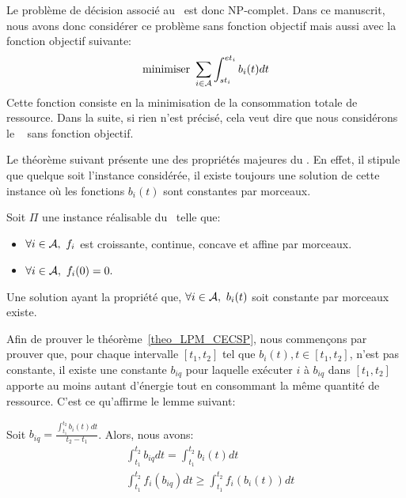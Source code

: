 Le problème de décision associé au \CECSP~est donc NP-complet. Dans ce
manuscrit, nous avons donc considérer ce problème sans fonction
objectif mais aussi avec la fonction objectif suivante: 
\[\text{minimiser } \sum_{i \in {\cal A}} \int_{st_i}^{et_i} b_i(t)dt\]
Cette fonction consiste en la minimisation de la consommation totale
de ressource. Dans la suite, si rien n'est précisé, cela veut dire que
nous considérons le \CECSP~ sans fonction objectif.

Le théorème suivant présente une des propriétés majeures du \CECSP. En
effet, il stipule que quelque soit l'instance considérée, il existe
toujours une solution de cette instance où les fonctions $b_i(t)$ sont
constantes par morceaux. 

\begin{theo}
\label{theo_LPM_CECSP}
Soit $\Pi$ une instance réalisable du \CECSP~telle que:
\begin{itemize}
\item $\forall i \in {\cal A},\ f_i$ est croissante, continue, concave et
  affine par morceaux. 
\item $\forall i \in \A,\ f_i(0)=0.$
\end{itemize}
Une solution ayant la propriété que, $\forall i \in {\cal A},\ b_i(t)$ soit
constante par morceaux existe.
\end{theo}

Afin de prouver le théorème~\ref{theo_LPM_CECSP}, nous commençons par
prouver que, pour chaque intervalle $[t_1,t_2]$ tel que $b_i(t), t \in
[t_1,t_2]$, n'est pas constante, il existe une constante $b_{iq}$ pour
laquelle exécuter $i$ à $b_{iq}$ dans $[t_1,t_2]$ apporte au moins
autant d'énergie tout en consommant la même quantité de
ressource. C'est ce qu'affirme le lemme suivant:

\begin{lemma}
\label{lemmaEn}
Soit $b_{iq}= \frac{\int_{t_1}^{t_2}b_i(t)dt}{t_2-t_1}$. Alors, nous
avons:
\begin{align}
  &\int_{t_1}^{t_2}b_{iq}dt = \int_{t_1}^{t_2} b_i(t) dt \label{eq_LPM_res} \\
  & \int_{t_1}^{t_2}f_i(b_{iq})dt \ge \int_{t_1}^{t_2} f_i(b_i(t)) dt 
    \label{eq_LPM_nrj}
\end{align}
\end{lemma}

